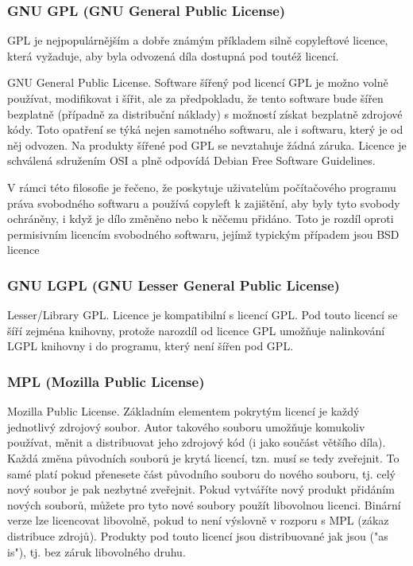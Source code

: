 \subsubsection{GNU GPL (GNU General Public License)}

GPL je nejpopulárnějším a dobře známým příkladem silně copyleftové licence, která vyžaduje, aby byla odvozená díla dostupná pod toutéž licencí. 

GNU General Public License. Software šířený pod licencí GPL je možno volně používat, modifikovat i šířit, ale za předpokladu, že tento software bude šířen bezplatně (případně za distribuční náklady) s možností získat bezplatně zdrojové kódy. Toto opatření se týká nejen samotného softwaru, ale i softwaru, který je od něj odvozen. Na produkty šířené pod GPL se nevztahuje žádná záruka. Licence je schválená sdružením OSI a plně odpovídá Debian Free Software Guidelines.

V rámci této filosofie je řečeno, že poskytuje uživatelům počítačového programu práva svobodného softwaru a používá copyleft k zajištění, aby byly tyto svobody ochráněny, i když je dílo změněno nebo k něčemu přidáno. Toto je rozdíl oproti permisivním licencím svobodného softwaru, jejímž typickým případem jsou BSD licence

\subsubsection{GNU LGPL (GNU Lesser General Public License)}

Lesser/Library GPL. Licence je kompatibilní s licencí GPL. Pod touto licencí se šíří zejména knihovny, protože narozdíl od licence GPL umožňuje nalinkování LGPL knihovny i do programu, který není šířen pod GPL.

\subsubsection{MPL (Mozilla Public License)}
Mozilla Public License. Základním elementem pokrytým licencí je každý jednotlivý zdrojový soubor. Autor takového souboru umožňuje komukoliv používat, měnit a distribuovat jeho zdrojový kód (i jako součást většího díla). Každá změna původních souborů je krytá licencí, tzn. musí se tedy zveřejnit. To samé platí pokud přenesete část původního souboru do nového souboru, tj. celý nový soubor je pak nezbytné zveřejnit. Pokud vytváříte nový produkt přidáním nových souborů, můžete pro tyto nové soubory použít libovolnou licenci. Binární verze lze licencovat libovolně, pokud to není výslovně v rozporu s MPL (zákaz distribuce zdrojů). Produkty pod touto licencí jsou distribuované jak jsou ("as is"), tj. bez záruk libovolného druhu.

